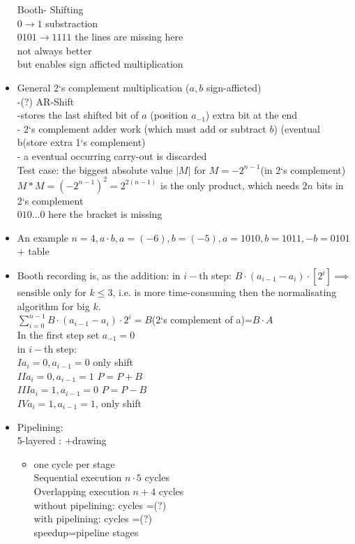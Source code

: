 \documentclass[a4paper, 11pt]{report}
\theoremstyle{break}
\theoremstyle{proofstyle}
\begin{document}
\begin{itemize}
        Booth- Shifting \\
        $0\to 1 $ substraction \\
        $0101\to 1111$ the lines are missing here \\
        \to not always better \\
        \to but enables sign afficted multiplication 
        \item General 2`s complement multiplication ($a,b$ sign-afficted) \\
        -(?) AR-Shift\\
        -stores the last shifted bit of $a$ (position $a_{-1}$) extra bit at the end \\ 
        - 2`s complement adder work (which must add or subtract $b$) (eventual b(store extra 1`s complement) \\ 
        - a eventual occurring carry-out is discarded \\
        
        Test case: the biggest absolute value $|M|$ for $M=-2^{n-1} $(in 2`s complement) \impliesq $M*M=(-2^{n-1})^2=2^{2(n-1)}$ is the only product, which needs $2n$ bits in 2`s complement \\
        \to $010...0 $ here the bracket is missing \\
        \item An example $n=4, a\cdot b, a=(-6), b=(-5), a=1010, b=1011, -b=0101$ + table  
        
        \item Booth recording is, as the addition: in $i-$th step: $B\cdot (a_{i-1}-a_i)\cdot[2^i] \implies $ sensible only for $k\leqslant 3$, i.e. is more time-consuming then the normalisating algorithm for big $k$. \\
        $\sum_{i=0}^{n-1} B\cdot (a_{i-1}-a_i)\cdot 2^i=B$(2`s complement of a)=$B\cdot A$ \\
        In the first step set $a_{-1}=0$ \\
        in $i-$th step: \\
        $I a_i=0, a_{i-1}=0$ only shift \\
        $II a_i=0, a_{i-1}=1$ $P=P+B$ \\
        $III a_i=1, a_{i-1}=0$ $P=P-B$ \\
        $IV a_i=1, a_{i-1}=1$, only shift \\ 
        
        \item Pipelining: \\
        5-layered : +drawing \\
        \begin{itemize}
            \item one cycle per stage \\ 
            Sequential execution $n\cdot 5$ cycles \\
            Overlapping execution $n+4$ cycles \\
            without pipelining: cycles =(?) \\
            with pipelining: cycles =(?) \\
            \to speedup=pipeline stages 
            

\end{itemize}
\end{itemize}
\end{document}
